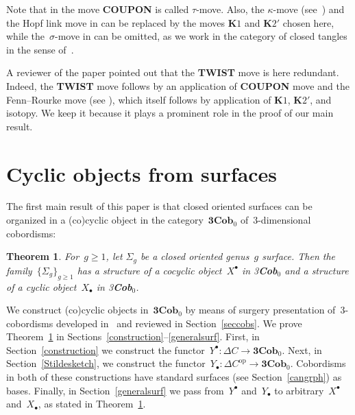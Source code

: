 \documentclass[10pt,a4paper]{amsart}
\numberwithin{equation}{section}
\newtheorem{Theorem}{Theorem}[section]
\newcommand{\co}{\colon}
\newcommand{\opp}{\mathrm{op}}
\newcommand{\Cob}{\textbf{Cob}}
\begin{document}
Note that in \cite[Theorem~3]{kerler-bridged-links} the move \textbf{COUPON} is called $\tau$-move. Also, the $\kappa$-move (see~\cite{Fenn-Rourke}) and the Hopf link move in \cite{kerler-bridged-links} can be replaced by the moves $\textbf{K}1$ and $\textbf{K}2'$ chosen here, while the~$\sigma$-move in \cite{kerler-bridged-links} can be omitted, as we work in the category of closed tangles in the sense of~\cite[Section~3.2.4]{kerler-bridged-links}.

\begin{Remark} A reviewer of the paper pointed out that the \textbf{TWIST} move is here redundant.
Indeed, the \textbf{TWIST} move follows by an application of \textbf{COUPON} move and the Fenn--Rourke move (see \cite{Fenn-Rourke}), which itself follows by application of $\textbf{K}1$, $\textbf{K}2'$, and isotopy. We keep it because it plays a prominent role in the proof of our main result.
\end{Remark}


\section{Cyclic objects from surfaces}\label{cobcyclic}
The first main result of this paper is that closed oriented surfaces can be organized in a (co)cyclic object in the category~$\textbf{3}\Cob_0$ of~$3$-dimensional cobordisms:



\begin{Theorem} \label{CYCINCOB}
For~$g\geq 1$, let $\Sigma_g$ be a closed oriented genus~$g$ surface. Then the fa\-mily~$\{\Sigma_g\}_{g\ge 1}$ has a structure of a cocyclic object~$X^\bullet$ in \emph{3\Cob}$_0$ and a structure of a cyclic object~$X_\bullet$ in \emph{3\Cob}$_0$.
\end{Theorem}

We construct (co)cyclic objects in~$\textbf{3}\Cob_0$ by means of surgery presentation of~$3$-cobordisms developed in~\cite{reshetikhin_invariants_1991, turaevqinvariants} and reviewed in Section~\ref{seccobs}.
We prove Theorem~\ref{CYCINCOB} in Sections~{\ref{construction}--\ref{generalsurf}}.
First, in Section~\ref{construction} we construct the functor~$Y^\bullet \co \Delta C\to \textbf{3}\Cob_0$.
Next, in Section~\ref{Stildesketch}, we construct the functor~$Y_{\bullet}\co \Delta C^{\opp}\to \textbf{3}\Cob_0$.
Cobordisms in both of these constructions have standard surfaces (see Section~\ref{cangrph}) as bases.
Finally, in Section~\ref{generalsurf} we pass from~$Y^\bullet$ and~$Y_\bullet$ to arbitrary~$X^\bullet$ and~$X_\bullet$, as stated in Theorem~\ref{CYCINCOB}.
\end{document}
